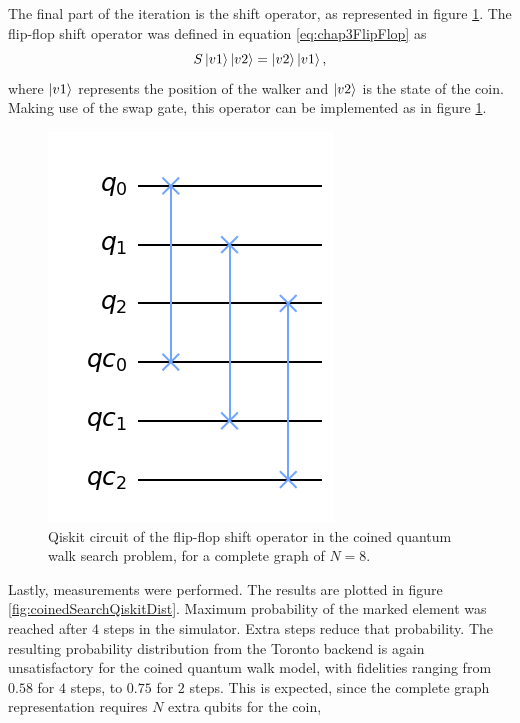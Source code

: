 \documentclass[../../dissertation.tex]{subfiles}
\begin{document}
The final part of the iteration is the shift operator, as represented in figure
\ref{fig:coinedQWSearchShiftCircuitQistkit}. The flip-flop shift operator was
defined in equation \eqref{eq:chap3FlipFlop} as
\begin{equation}
        S\ket{v1}\ket{v2} = \ket{v2}\ket{v1},
        \label{eq:chap4FlipFlop}
\end{equation}
where $\ket{v1}$ represents the position of the walker and $\ket{v2}$ is the
state of the coin. Making use of the swap gate, this operator can be
implemented as in figure \ref{fig:coinedQWSearchShiftCircuitQistkit}.
\begin{figure}[!h]
	\centering
	\includegraphics[scale=0.27]{img/Qiskit/CoinedQuantumWalk/Search/Circuits/CoinedSearchQiskitCircShift_N3_M4_S5.png}
	\caption{Qiskit circuit of the  flip-flop shift operator in the coined quantum walk search problem, for a complete graph of $N=8$.} 
	\label{fig:coinedQWSearchShiftCircuitQistkit}
\end{figure}\par
Lastly, measurements were performed. The results are plotted in figure
\ref{fig:coinedSearchQiskitDist}. Maximum probability of the marked element was
reached after $4$ steps in the simulator. Extra steps reduce that
probability.  The resulting probability distribution from the Toronto backend
is again unsatisfactory for the coined quantum walk model, with fidelities
ranging from $0.58$ for $4$ steps, to $0.75$ for $2$ steps. This is expected,
since the complete graph representation requires $N$ extra qubits for the coin,
\end{document}
